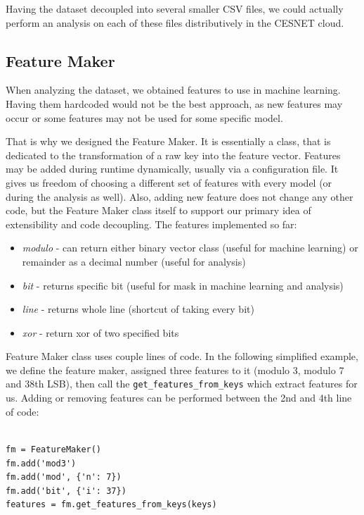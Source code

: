 Having the dataset decoupled into several smaller CSV files, we could actually perform an analysis on each of these files distributively in the CESNET cloud.

\subsection*{Feature Maker}

\label{feature-maker}

When analyzing the dataset, we obtained features to use in machine learning. Having them hardcoded would not be the best approach, as new features may occur or some features may not be used for some specific model. 

That is why we designed the Feature Maker. It is essentially a class, that is dedicated to the transformation of a raw key into the feature vector. Features may be added during runtime dynamically, usually via a configuration file. It gives us freedom of choosing a different set of features with every model (or during the analysis as well). Also, adding new feature does not change any other code, but the Feature Maker class itself to support our primary idea of extensibility and code decoupling. The features implemented so far:

\begin{itemize}

\item \textit{modulo} - can return either binary vector class (useful for machine learning) or remainder as a decimal number (useful for analysis)
\item \textit{bit} - returns specific bit (useful for mask in machine learning and analysis)
\item \textit{line} - returns whole line (shortcut of taking every bit)
\item \textit{xor} - return xor of two specified bits

\end{itemize}

\noindent
Feature Maker class uses couple lines of code. In the following simplified example, we define the feature maker, assigned three features to it (modulo 3, modulo 7 and 38th LSB), then call the \texttt{get\_features\_from\_keys} which extract features for us. Adding or removing features can be performed between the 2nd and 4th line of code:

\begin{verbatim}

fm = FeatureMaker()
fm.add('mod3')
fm.add('mod', {'n': 7})
fm.add('bit', {'i': 37})
features = fm.get_features_from_keys(keys)

\end{verbatim}

